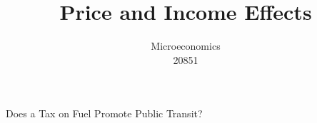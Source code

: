 \documentclass[handout]{beamer}
\title{Price and Income Effects}
\author{Microeconomics \\ 20851}
\date{}
\begin{document}
\frame{\titlepage}

\section[Outline]{}
\frame{\tableofcontents}

\begin{frame}{Does a Tax on Fuel Promote Public Transit?}
\begin{figure}

\end{figure}
\end{frame}
\end{document}
